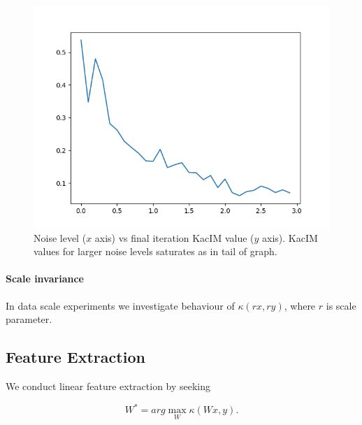 \documentclass{article}
\begin{document}
{%

\begin{figure}[t]
\label{fig:experiments_noise_level_effect}
\centering
\includegraphics[scale=0.50]{./summary_noise_effect.png}
\caption{Noise level ($x$ axis) vs final iteration KacIM value ($y$ axis). KacIM values for larger noise levels saturates as in tail of graph.}
\end{figure}

\paragraph{Scale invariance} In data scale experiments we investigate behaviour of $\kappa(rx, ry)$, where $r$ is scale parameter.




\subsection{Feature Extraction}

We conduct linear feature extraction by seeking 

\begin{equation}
\label{eq:kim_feature_extraction}    
W^{*} = arg \max_{W} \kappa(Wx, y).
\end{equation}



}
\end{document}
